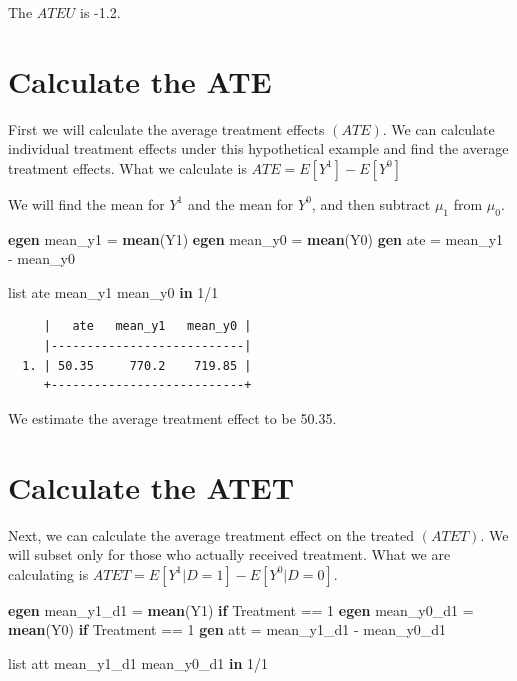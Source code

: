 \documentclass[
]{book}
\newenvironment{Shaded}{\begin{snugshade}}{\end{snugshade}}
\newcommand{\KeywordTok}[1]{\textcolor[rgb]{0.13,0.29,0.53}{\textbf{#1}}}
\newcommand{\NormalTok}[1]{#1}
\newcommand{\OtherTok}[1]{\textcolor[rgb]{0.56,0.35,0.01}{#1}}
\begin{document}
The \(ATEU\) is -1.2.

\section{Calculate the ATE}\label{calculate-the-ate}

First we will calculate the average treatment effects \((ATE)\). We can calculate individual treatment effects under this hypothetical example and find the average treatment effects. What we calculate is \(ATE=E[Y^1]-E[Y^0]\)

We will find the mean for \(Y^1\) and the mean for \(Y^0\), and then subtract \(\mu_1\) from \(\mu_0\).

\begin{Shaded}
\begin{Highlighting}[]
\KeywordTok{egen}\NormalTok{ mean\_y1 = }\KeywordTok{mean}\NormalTok{(Y1)}
\KeywordTok{egen}\NormalTok{ mean\_y0 = }\KeywordTok{mean}\NormalTok{(Y0)}
\KeywordTok{gen}\NormalTok{ ate = mean\_y1 {-} mean\_y0}


\OtherTok{list}\NormalTok{ ate mean\_y1 mean\_y0 }\KeywordTok{in}\NormalTok{ 1/1}
\end{Highlighting}
\end{Shaded}

\begin{verbatim}
     |   ate   mean_y1   mean_y0 |
     |---------------------------|
  1. | 50.35     770.2    719.85 |
     +---------------------------+
\end{verbatim}

We estimate the average treatment effect to be 50.35.

\section{Calculate the ATET}\label{calculate-the-atet}

Next, we can calculate the average treatment effect on the treated \((ATET)\). We will subset only for those who actually received treatment. What we are calculating is \(ATET=E[Y^1|D=1]-E[Y^0|D=0]\).

\begin{Shaded}
\begin{Highlighting}[]
\KeywordTok{egen}\NormalTok{ mean\_y1\_d1 = }\KeywordTok{mean}\NormalTok{(Y1) }\KeywordTok{if}\NormalTok{ Treatment == 1}
\KeywordTok{egen}\NormalTok{ mean\_y0\_d1 = }\KeywordTok{mean}\NormalTok{(Y0) }\KeywordTok{if}\NormalTok{ Treatment == 1}
\KeywordTok{gen}\NormalTok{ att = mean\_y1\_d1 {-} mean\_y0\_d1}

\OtherTok{list}\NormalTok{ att mean\_y1\_d1 mean\_y0\_d1 }\KeywordTok{in}\NormalTok{ 1/1}
\end{Highlighting}
\end{Shaded}
\end{document}

